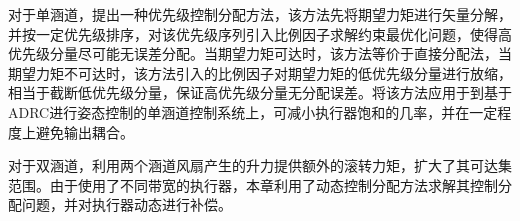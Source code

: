 对于单涵道，提出一种优先级控制分配方法，该方法先将期望力矩进行矢量分解，并按一定优先级排序，对该优先级序列引入比例因子求解约束最优化问题，使得高优先级分量尽可能无误差分配。当期望力矩可达时，该方法等价于直接分配法，当期望力矩不可达时，该方法引入的比例因子对期望力矩的低优先级分量进行放缩，相当于截断低优先级分量，保证高优先级分量无分配误差。将该方法应用于到基于ADRC进行姿态控制的单涵道控制系统上，可减小执行器饱和的几率，并在一定程度上避免输出耦合。

对于双涵道，利用两个涵道风扇产生的升力提供额外的滚转力矩，扩大了其可达集范围。由于使用了不同带宽的执行器，本章利用了动态控制分配方法求解其控制分配问题，并对执行器动态进行补偿。








